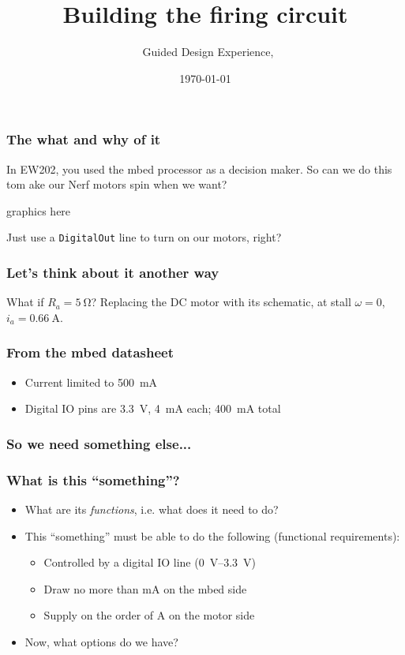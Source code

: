 \documentclass[aspectratio=169]{beamer}
\title{Building the firing circuit}
\subtitle{\usnaCourseNumber\ Guided Design Experience, \usnaCourseTerm}
\author{\usnaInstructorShort}
\date{\today}
\begin{document}
\settitlebg
\begin{frame}
\titlepage
\end{frame}

\setslidebg
\begin{frame}
\frametitle{The what and why of it}
In EW202, you used the mbed processor as a decision maker. So can we do this tom ake our Nerf motors spin when we want?
\begin{center}
graphics here
\end{center}
Just use a \lstinline{DigitalOut} line to turn on our motors, right? 
\end{frame}

\begin{frame}
\frametitle{Let's think about it another way}
What if $R_a=\SI{5}{\ohm}$? Replacing the DC motor with its schematic, at stall $\omega=0$, $i_a=\SI{0.66}{\ampere}$. 
\end{frame}

\begin{frame}
\frametitle{From the mbed datasheet}
\begin{itemize}
\item Current limited to \SI{500}{\milli\ampere}
\item Digital IO pins are \SI{3.3}{\volt}, \SI{4}{\milli\ampere} each; \SI{400}{\milli\ampere} total
\end{itemize}
\end{frame}

\begin{frame}
\frametitle{So we need something else...}
\end{frame}

\begin{frame}
\frametitle{What is this ``something''?}
\begin{itemize}
\item What are its \emph{functions}, i.e. what does it need to do?
\item This ``something'' must be able to do the following (functional requirements):
\begin{itemize}
\item Controlled by a digital IO line (\SIrange{0}{3.3}{\volt})
\item Draw no more than \si{\milli\ampere} on the mbed side
\item Supply on the order of \si{\ampere} on the motor side
\end{itemize}
\item Now, what options do we have? 
\end{itemize}
\end{frame}
\end{document}
